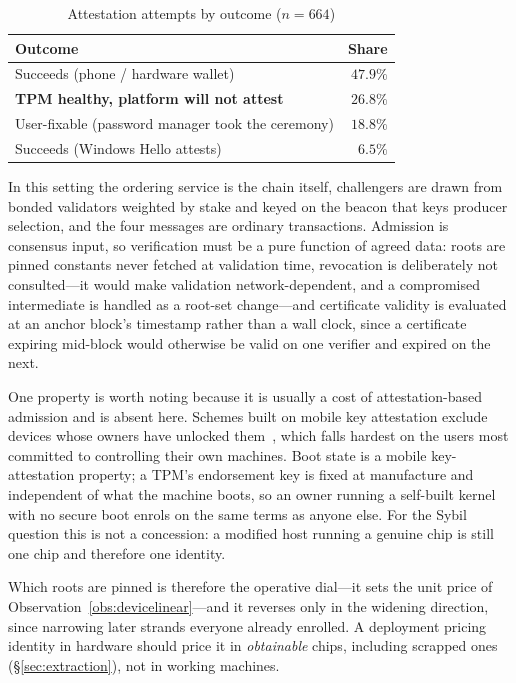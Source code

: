 \documentclass[conference,10pt]{IEEEtran}
\begin{document}
\begin{table}[t]
\caption{Attestation attempts by outcome ($n=664$)}
\label{tab:gap}
\centering
\small
\begin{tabular}{@{}lr@{}}
\toprule
Outcome & Share \\
\midrule
Succeeds (phone / hardware wallet) & $47.9\%$ \\
\textbf{TPM healthy, platform will not attest} & $\mathbf{26.8\%}$ \\
User-fixable (password manager took the ceremony) & $18.8\%$ \\
Succeeds (Windows Hello attests) & $6.5\%$ \\
\bottomrule
\end{tabular}
\end{table}

In this setting the ordering service is the chain itself, challengers are drawn from bonded validators
weighted by stake and keyed on the beacon that keys producer selection, and the four messages are
ordinary transactions. Admission is consensus input, so verification must be a pure function of agreed
data: roots are pinned constants never fetched at validation time, revocation is deliberately not
consulted---it would make validation network-dependent, and a compromised intermediate is handled as a
root-set change---and certificate validity is evaluated at an anchor block's timestamp rather than a
wall clock, since a certificate expiring mid-block would otherwise be valid on one verifier and expired
on the next.

One property is worth noting because it is usually a cost of attestation-based admission and is absent
here. Schemes built on mobile key attestation exclude devices whose owners have unlocked
them~\cite{androidkeyattest}, which falls hardest on the users most committed to controlling their own
machines. Boot state is a mobile key-attestation property; a TPM's endorsement key is fixed at
manufacture and independent of what the machine boots, so an owner running a self-built kernel with no
secure boot enrols on the same terms as anyone else. For the Sybil question this is not a concession: a
modified host running a genuine chip is still one chip and therefore one identity.

Which roots are pinned is therefore the operative dial---it sets the unit price of
Observation~\ref{obs:devicelinear}---and it reverses only in the widening direction, since narrowing
later strands everyone already enrolled. A deployment pricing identity in hardware should price it in
\emph{obtainable} chips, including scrapped ones (\S\ref{sec:extraction}), not in working machines.
\end{document}
